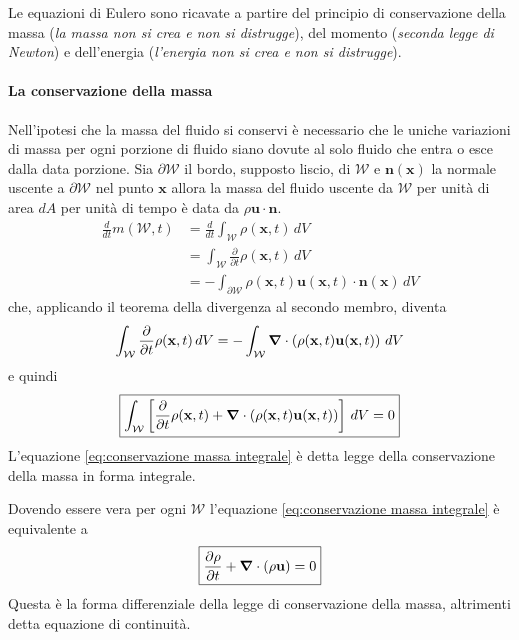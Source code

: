 Le equazioni di Eulero sono ricavate a partire del principio di conservazione della massa (\emph{la massa non si crea e non si distrugge}), del momento (\emph{seconda legge di Newton}) e dell'energia (\emph{l'energia non si crea e non si distrugge}).

\paragraph{La conservazione della massa}
Nell'ipotesi che la massa del fluido si conservi è necessario che le uniche variazioni di massa per ogni porzione di fluido siano dovute al solo fluido che entra o esce dalla data porzione. Sia $\partial \mathcal{W}$ il bordo, supposto liscio, di  $\mathcal{W}$ e $\mathbf{n}(\mathbf{x})$ la normale uscente a $\partial \mathcal{W}$ nel punto $\mathbf{x}$ allora la massa del fluido uscente da $\mathcal{W}$ per unità di area $dA$ per unità di tempo è data da $\rho \mathbf{u}\cdot \mathbf{n}$.
\begin{equation*}  
\begin{split}
\frac{d}{dt} m(\mathcal{W},t) &= \frac{d}{dt}  \int_{\mathcal{W}}\rho(\mathbf{x},t) \, dV \\
                              &= \int_{\mathcal{W}}\frac{\partial}{\partial t}\rho(\mathbf{x},t) \, dV \\
                              &= - \int_{\partial \mathcal{W}}\rho(\mathbf{x},t) \mathbf{u}(\mathbf{x},t) \cdot \mathbf{n}(\mathbf{x}) \, dV
\end{split}
\end{equation*}
che, applicando il teorema della divergenza al secondo membro, diventa
\begin{equation*}
\int_{\mathcal{W}}\frac{\partial}{\partial t}\rho(\mathbf{x},t) \, dV = -\int_{\mathcal{W}}\boldsymbol{\nabla} \cdot \left (\rho(\mathbf{x},t) \mathbf{u}(\mathbf{x},t) \right ) \, dV
\end{equation*}
e quindi
\begin{equation}\label{eq:conservazione massa integrale}
\boxed{
\int_{\mathcal{W}}\left [ \frac{\partial}{\partial t}\rho(\mathbf{x},t) + \boldsymbol{\nabla} \cdot (\rho(\mathbf{x},t) \mathbf{u}(\mathbf{x},t)) \right ]\, dV = 0
}
\end{equation}
L'equazione \ref{eq:conservazione massa integrale} è detta legge della conservazione della massa in forma integrale.

Dovendo essere vera per ogni $\mathcal{W}$ l'equazione \ref{eq:conservazione massa integrale} è equivalente a 
\begin{equation}\label{eq:conservazione massa differenziale}
\boxed{
\frac{\partial \rho}{\partial t} + \boldsymbol{\nabla} \cdot (\rho \mathbf{u}) = 0
}
\end{equation}
Questa è la forma differenziale della legge di conservazione della massa, altrimenti detta equazione di continuità.

